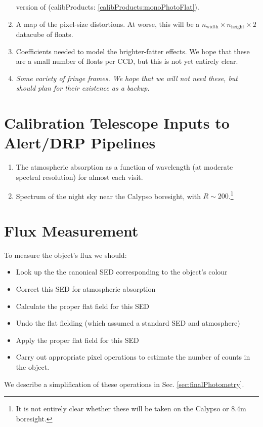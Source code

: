 \documentclass[12pt]{article}
\newcommand{\outputData}[1]{(calibProducts: \ref{calibProducts:#1})}
\newcommand{\secRef}[1]{Sec. \ref{sec:#1}}
\begin{document}
\begin{enumerate}[label=\textbf{\S}\arabic*,itemsep=5pt]
     version of \outputData{monoPhotoFlat}.
   \item\label{calibProducts:pixelSizeMap}  A map of the pixel-size distortions.  At worse, this will be
     a $n_{\mbox{width}}\times n_{\mbox{height}}\times 2$ datacube of floats.
   \item\label{calibProducts:brighterFatterCoeffs}  Coefficients needed to model the brighter-fatter effects.
     We hope that these are a small number of floats per CCD, but this is not yet entirely clear.
   \item\label{calibProducts:fringeFrames}  \textit{Some variety of fringe frames.  We hope that we will not
     need these, but should plan for their existence as a backup.}
\end{enumerate}


\section{Calibration Telescope Inputs to Alert/DRP Pipelines}
\label{sec:calibrationTelescopeDatasets}

\begin{enumerate}[label=$\heartsuit$\arabic*,itemsep=5pt]
   \item\label{calypso:atmosphericAbsorption} The atmospheric absorption as a function of wavelength (at
     moderate spectral resolution) for almost each visit.
   \item\label{calypso:nightSkySpectrum} Spectrum of the night sky near the Calypso boresight, with $R
     \sim 200$.\footnote{It is not entirely clear whether these will be taken on the Calypso or 8.4m
       boresight.}
\end{enumerate}


\section{Flux Measurement}
\label{app:properFluxMeasurement}

To measure the object's flux we should:
\begin{itemize}
\item Look up the the canonical SED corresponding to the object's colour
\item Correct this SED for atmospheric absorption
\item Calculate the proper flat field for this SED
\item Undo the flat fielding (which assumed a standard SED and atmosphere)
\item Apply the proper flat field for this SED
\item Carry out appropriate pixel operations to estimate the number of counts in the object.
\end{itemize}

We describe a simplification of these operations in \secRef{finalPhotometry}.


\end{document}

